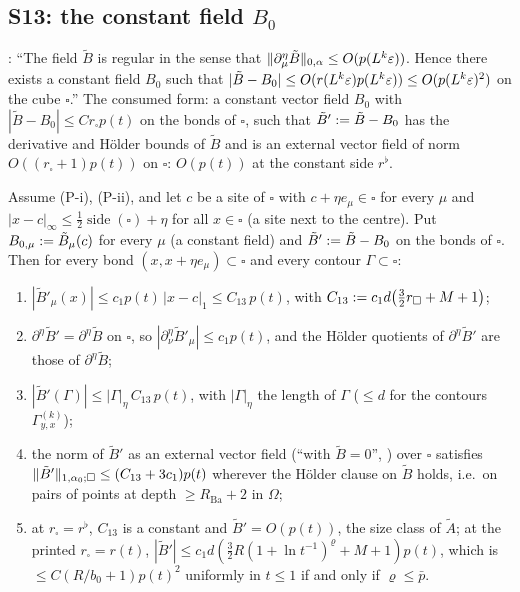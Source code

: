 \subsection{S13: the constant field $B_0$}\label{sup3:ssec:S13}

\cite[p.~433]{Ba3}: ``The field $\tilde B$ is regular in the sense that $\lVert \partial^\eta_\mu\tilde B\rVert_{0,\alpha}\le O(p(L^k\varepsilon))$. Hence there exists a constant field $B_0$ such that $|\tilde B-B_0|\le O(r(L^k\varepsilon)p(L^k\varepsilon))\le O(p(L^k\varepsilon)^2)$ on the cube $\square$.'' The consumed form: a constant vector field $B_0$ with $|\tilde B-B_0|\le Cr_\square p(t)$ on the bonds of $\square$, such that $\tilde B':=\tilde B-B_0$ has the derivative and H\"older bounds of $\tilde B$ and is an external vector field of norm \cite[(1.32)]{Ba3} $O((r_\square+1)p(t))$ on $\square$: $O(p(t))$ at the constant side $r^\flat$.

\begin{lemma}\label{sup3:lem:S13}
Assume (P-i), (P-ii), and let $c$ be a site of $\square$ with $c+\eta e_\mu\in\square$ for every $\mu$ and $|x-c|_\infty\le\frac12\operatorname{side}(\square)+\eta$ for all $x\in\square$ (a site next to the centre). Put $B_{0,\mu}:=\tilde B_\mu(c)$ for every $\mu$ (a constant field) and $\tilde B':=\tilde B-B_0$ on the bonds of $\square$. Then for every bond $(x,x+\eta e_\mu)\subset\square$ and every contour $\Gamma\subset\square$:
\begin{enumerate}[label=\textup{(\alph*)},nosep,leftmargin=*]
\item $|\tilde B'_\mu(x)|\le c_1p(t)\,|x-c|_1\le C_{13}\,p(t)$, with $C_{13}:= c_1d\big(\tfrac32r_\square+M+1\big)$;
\item $\partial^\eta\tilde B'=\partial^\eta\tilde B$ on $\square$, so $|\partial^\eta_\nu\tilde B'_\mu|\le c_1p(t)$, and the H\"older quotients of $\partial^\eta\tilde B'$ are those of $\partial^\eta\tilde B$;
\item $|\tilde B'(\Gamma)|\le|\Gamma|_\eta\,C_{13}\,p(t)$, with $|\Gamma|_\eta$ the length of $\Gamma$ ($\le d$ for the contours $\Gamma^{(k)}_{y,x}$);
\item the norm \cite[(1.32)]{Ba3} of $\tilde B'$ as an external vector field (``with $\tilde B=0$'', \cite[p.~420]{Ba3}) over $\square$ satisfies $\lVert \tilde B'\rVert_{1,\alpha_0;\square}\le(C_{13}+3c_1)p(t)$ wherever the H\"older clause on $\tilde B$ holds, i.e.\ on pairs of points at depth $\ge R_{\mathrm{Ba}}+2$ in $\Omega$;
\item at $r_\square=r^\flat$, $C_{13}$ is a constant and $\tilde B'=O(p(t))$, the size class of $\tilde A$; at the printed $r_\square=r(t)$, $|\tilde B'|\le c_1d(\tfrac32R(1+\ln t^{-1})^{\varrho}+M+1)p(t)$, which is $\le C(R/b_0+1)p(t)^2$ uniformly in $t\le1$ if and only if $\varrho\le\bar p$.
\end{enumerate}
\end{lemma}

